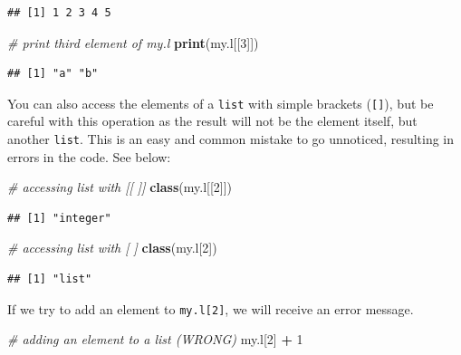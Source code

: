 \documentclass[11pt,]{book}
\newenvironment{Shaded}{\begin{snugshade}}{\end{snugshade}}
\newcommand{\KeywordTok}[1]{\textcolor[rgb]{0.27,0.27,0.27}{\textbf{#1}}}
\newcommand{\DecValTok}[1]{\textcolor[rgb]{0.06,0.06,0.06}{#1}}
\newcommand{\StringTok}[1]{\textcolor[rgb]{0.5,0.5,0.5}{#1}}
\newcommand{\CommentTok}[1]{\textcolor[rgb]{0.56,0.35,0.01}{\textit{#1}}}
\newcommand{\OperatorTok}[1]{\textcolor[rgb]{0.81,0.36,0.00}{\textbf{#1}}}
\newcommand{\NormalTok}[1]{#1}
\begin{document}
\begin{verbatim}
## [1] 1 2 3 4 5
\end{verbatim}

\begin{Shaded}
\begin{Highlighting}[]
\CommentTok{# print third element of my.l}
\KeywordTok{print}\NormalTok{(my.l[[}\DecValTok{3}\NormalTok{]])}
\end{Highlighting}
\end{Shaded}

\begin{verbatim}
## [1] "a" "b"
\end{verbatim}

You can also access the elements of a \texttt{list} with simple brackets
(\texttt{{[}{]}}), but be careful with this operation as the result will
not be the element itself, but another \texttt{list}. This is an easy
and common mistake to go unnoticed, resulting in errors in the code. See
below:

\begin{Shaded}
\begin{Highlighting}[]
\CommentTok{# accessing list with [[ ]]}
\KeywordTok{class}\NormalTok{(my.l[[}\DecValTok{2}\NormalTok{]])}
\end{Highlighting}
\end{Shaded}

\begin{verbatim}
## [1] "integer"
\end{verbatim}

\begin{Shaded}
\begin{Highlighting}[]
\CommentTok{# accessing list with [ ]}
\KeywordTok{class}\NormalTok{(my.l[}\DecValTok{2}\NormalTok{])}
\end{Highlighting}
\end{Shaded}

\begin{verbatim}
## [1] "list"
\end{verbatim}

If we try to add an element to \texttt{my.l{[}2{]}}, we will receive an
error message.

\begin{Shaded}
\begin{Highlighting}[]
\CommentTok{# adding an element to a list (WRONG)}
\NormalTok{my.l[}\DecValTok{2}\NormalTok{] }\OperatorTok{+}\StringTok{ }\DecValTok{1}
\end{Highlighting}
\end{Shaded}
\end{document}
